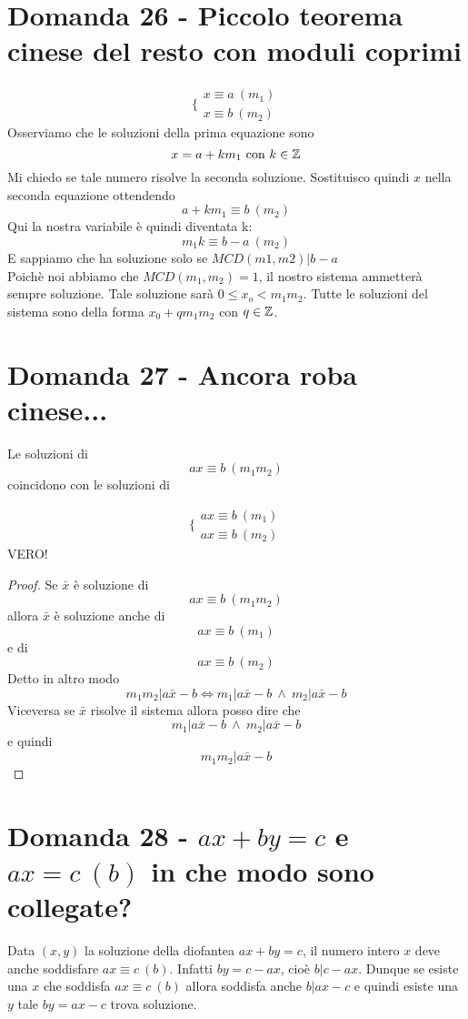 \documentclass[]{article}
\begin{document}
\section{Domanda 26 - Piccolo teorema cinese del resto con moduli coprimi}
$$\bigg \{ 
\begin{array}{l}
	x \equiv a\ (m_1)\\
	x \equiv b\ (m_2)
\end{array}
$$
Osserviamo che le soluzioni della prima equazione sono $$x = a+km_1 \text{ con } k \in \mathbb{Z}$$
Mi chiedo se tale numero risolve la seconda soluzione. Sostituisco quindi $x$ nella seconda equazione ottendendo $$a+km_1\equiv b\ (m_2)$$
Qui la nostra variabile è quindi diventata k: $$m_1k\equiv b-a\ (m_2)$$ E sappiamo che ha soluzione solo se $MCD(m1, m2) | b-a$\\
Poichè noi abbiamo che $MCD(m_1, m_2)=1$, il nostro sistema ammetterà sempre soluzione. Tale soluzione sarà $0\le x_o < m_1m_2$. Tutte le soluzioni del sistema sono della forma $x_0 + qm_1m_2$ con $q \in \mathbb{Z}$.
\section{Domanda 27 - Ancora roba cinese...}
Le soluzioni di
$$ax	\equiv b\ (m_1m_2)$$
coincidono con le soluzioni di
\begin{center} 
$$\bigg \{
	\begin{array}{l}
		ax \equiv b\ (m_1) \\ 
		ax \equiv b\ (m_2)
	\end{array}
$$VERO!
\end{center}
\begin{proof}
Se $\bar{x}$ è soluzione di $$ax \equiv b\ (m_1m_2)$$ allora $\bar{x}$ è soluzione anche di $$ax \equiv b\ (m_1)$$ e di $$ax \equiv b\ (m_2)$$
Detto in altro modo $$m_1m_2 | a\bar{x}-b \Leftrightarrow m_1 | a\bar{x}-b\  \wedge \ m_2 | a\bar{x}-b$$
Viceversa se $\bar{x}$ risolve il sistema allora posso dire che $$m_1 | a\bar{x}-b \ \wedge \ m_2 | a\bar{x}-b$$ e quindi $$m_1m_2|a\bar{x}-b$$
\end{proof}
\section{Domanda 28 - $ax+by=c$ e $ax=c\ (b)$ in che modo sono collegate?}
Data $(x,y)$ la soluzione della diofantea $ax+by=c$, il numero intero $x$ deve anche soddisfare $ax\equiv c\ (b)$. Infatti $by = c-ax$, cioè $b|c-ax$. Dunque se esiste una $x$ che soddisfa $ax\equiv c\ (b)$ allora soddisfa anche $b|ax-c$ e quindi esiste una $y$ tale $by = ax-c$ trova soluzione.
\end{document}
